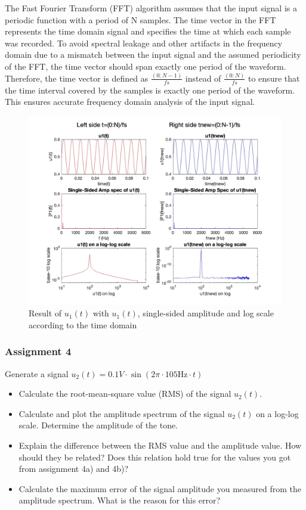 \documentclass[
	a4paper,
	11pt,
]{article}
\begin{document}
The Fast Fourier Transform (FFT) algorithm assumes that the input signal is a periodic function with a period of N samples. The time vector in the FFT represents the time domain signal and specifies the time at which each sample was recorded. To avoid spectral leakage and other artifacts in the frequency domain due to a mismatch between the input signal and the assumed periodicity of the FFT, the time vector should span exactly one period of the waveform. Therefore, the time vector is defined as \(\frac{(0:N-1)}{fs}\) instead of \(\frac{(0:N)}{fs}\) to ensure that the time interval covered by the samples is exactly one period of the waveform. This ensures accurate frequency domain analysis of the input signal.

\begin{figure}[htb!]
    \centerline{\includegraphics[width=18cm]{A2/a3.all.jpg}}
    \caption{Result of \(u_1(t)\) with \(u_1(t)\), single-sided amplitude and log scale according to the time domain}
\end{figure}

\newpage

\subsubsection{Assignment 4}
Generate a signal \( u_2(t) = 0.1 V \cdot\sin(2\pi\cdot105\text{Hz}\cdot t) \)

\begin{itemize}
\item Calculate the root-mean-square value (RMS) of the signal \(u_2(t)\).
\item Calculate and plot the amplitude spectrum of the signal \(u_2(t)\) on a log-log scale. Determine the
amplitude of the tone.
\item Explain the difference between the RMS value and the amplitude value. How should they be related? Does this relation hold true for the values you got from assignment 4a) and 4b)?
\item Calculate the maximum error of the signal amplitude you measured from the amplitude spectrum. What is the reason for this error?
\end{itemize}
\end{document}
